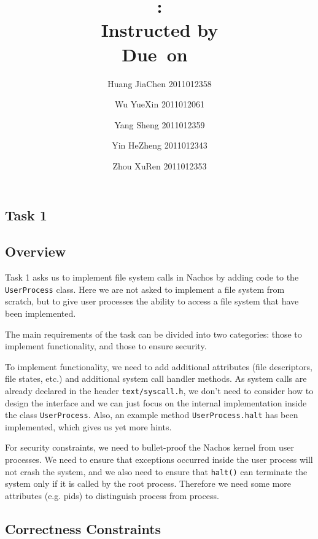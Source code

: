 \documentclass{article}
\title{\textmd{\bf \Class: \Title}\\{\large Instructed by \textit{\ClassInstructor}}\\\normalsize\vspace{0.1in}\small{Due\ on\ \DueDate}}
\date{}
\author{%
  Huang JiaChen 2011012358 \and
  Wu YueXin 2011012061 \and
  Yang Sheng 2011012359 \and
  Yin HeZheng 2011012343 \and
  Zhou XuRen 2011012353}
\begin{document}
  \begin{spacing}{1.1}
    \maketitle \thispagestyle{empty}


 
\section{Task 1}
\subsection{Overview}
Task 1 asks us to implement file system calls  in Nachos by adding code to the \texttt{UserProcess} class. Here we are not asked to implement a file system from scratch, but to give user processes the ability to access a file system that have been implemented.

The main requirements of the task can be divided into two categories: those to implement functionality, and those to ensure security.

To implement functionality, we need to add additional attributes (file descriptors, file states, etc.) and additional system call handler methods. As system calls are already declared in the header \texttt{text/syscall.h}, we don't need to consider how to design the interface and we can just focus on the internal implementation inside the class \texttt{UserProcess}. Also, an example method \texttt{UserProcess.halt} has been implemented, which gives us yet more hints.

For security constraints, we need to bullet-proof the Nachos kernel from user processes. We need to ensure that exceptions occurred inside the user process will not crash the system, and we also need to ensure that \texttt{halt()} can terminate the system only if it is called by the root process. Therefore we need some more attributes (e.g. pids) to distinguish process from process.

\subsection{Correctness Constraints}


\end{spacing}
\end{document}
